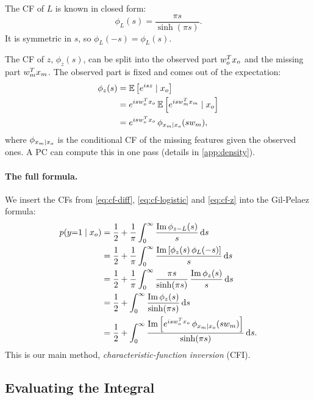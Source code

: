 The CF of $L$ is known in closed form:
\begin{equation}
  \phi_L(s) = \frac{\pi s}{\sinh(\pi s)}.
  \label{eq:cf-logistic}
\end{equation}
It is symmetric in $s$, so $\phi_L(-s) = \phi_L(s)$.

The CF of $z$, $\phi_z(s)$, can be split into the observed part $w_o^T x_o$ and the missing part $w_m^T x_m$.
The observed part is fixed and comes out of the expectation:
\begin{align}
  \phi_z(s) &= \mathbb{E}\left[ e^{isz} \mid x_o \right] \notag \\
  &= e^{i s w_o^T x_o}\, \mathbb{E}\left[ e^{i s w_m^T x_m} \mid x_o \right] \notag \\
  &= e^{i s w_o^T x_o}\, \phi_{x_m \mid x_o}(s w_m),
  \label{eq:cf-z}
\end{align}
where $\phi_{x_m \mid x_o}$ is the conditional CF of the missing features given the observed ones.
A PC can compute this in one pass (details in \cref{app:density}).

\paragraph{The full formula.}
We insert the CFs from \eqref{eq:cf-diff}, \eqref{eq:cf-logistic} and \eqref{eq:cf-z} into the Gil-Pelaez formula:
\begin{align}
  p(y{=}1 \mid x_o) &= \frac{1}{2} + \frac{1}{\pi} \int_0^\infty \frac{\mathrm{Im}\, \phi_{z - L}(s)}{s} \, \mathrm{d}s \notag \\
  &= \frac{1}{2} + \frac{1}{\pi} \int_0^\infty \frac{\mathrm{Im} \left[ \phi_z(s)\, \phi_L(-s) \right]}{s} \, \mathrm{d}s \notag \\
  &= \frac{1}{2} + \frac{1}{\pi} \int_0^\infty \frac{\pi s}{\sinh(\pi s)}\, \frac{\mathrm{Im}\, \phi_z(s)}{s} \, \mathrm{d}s \notag \\
  &= \frac{1}{2} + \int_0^\infty \frac{\mathrm{Im}\, \phi_z(s)}{\sinh(\pi s)} \, \mathrm{d}s \notag \\
  &= \frac{1}{2} + \int_0^\infty \frac{\mathrm{Im} \left[ e^{i s w_o^T x_o}\, \phi_{x_m \mid x_o}(s w_m) \right]}{\sinh(\pi s)} \, \mathrm{d}s. \label{eq:cfi}
\end{align}
This is our main method, \emph{characteristic-function inversion} (CFI).

\subsection{Evaluating the Integral}
\label{sec:cfi-integral}

